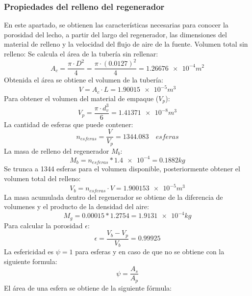 \documentclass[12pt,letterpaper,final]{article}%
\begin{document}
\subsubsection{Propiedades del relleno del regenerador}
En este apartado, se obtienen las características necesarias para conocer la porosidad del lecho, a partir del largo del regenerador,  las dimensiones del material de relleno y la velocidad del flujo de aire de la fuente. 
 \newline
 Volumen total sin relleno:
 Se calcula el área de la tubería sin rellenar:
 \begin{equation*}
 	A_c= \frac{\pi \cdot D^2}{4} = \frac{\pi \cdot (0.0127)^2}{4} =\num{1.26676e-4} m^2
 \end{equation*}
 Obtenida el área se obtiene el volumen de la tubería:
 \begin{equation*}
 	V=A_c \cdot L = \num{1.90015e-5} m^3
 \end{equation*}
Para obtener el volumen del material de empaque ($V_p$):
\begin{equation*}
	V_p= \frac{\pi \cdot d_v^3}{6} = \num{1.41371e-8} m^3
\end{equation*}
La cantidad de esferas que puede contener:
\begin{equation*}
	n_{esferas}= \frac{V}{V_p} = 1344.083 \quad esferas
\end{equation*}
La masa de relleno del regenerador $M_b$:
\begin{equation*}
	M_{b}= n_{esferas}*\num{1.4e-4} = 0.1882 kg 
\end{equation*}
Se trunca a 1344 esferas para el volumen disponible, posteriormente obtener el volumen total del relleno:
\begin{equation*}
	V_b= n_{esferas} \cdot V = \num{1.900153e-5} m^3
\end{equation*}
La masa acumulada dentro del regenerador se obtiene de la diferencia de volumenes y el producto de la densidad del aire:
\begin{equation*}
	M_g = 0.00015 * 1.2754 = \num{1.9131e-4} kg
\end{equation*}
Para calcular la porosidad $\epsilon$:
\begin{equation*}
	\epsilon = \frac{V_b-V_p}{V_b} = 0.99925
\end{equation*}
La esfericidad es $\psi = 1$ para esferas y en caso de que no se obtiene con la siguiente formula:
\begin{equation}
	\psi = \frac{A_s}{A_p}
\end{equation}
El área de una esfera se obtiene de la siguiente fórmula:
\end{document}
